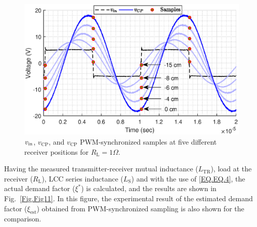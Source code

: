 \documentclass[journal,a4paper]{IEEEtran}
\begin{document}
\begin{figure}[t!]
\begin{center}
	\includegraphics[clip, trim=1cm 0.0cm 1cm 0cm, width=1\columnwidth]{Figs/Fig10.eps}
\end{center}
\vspace{-0.1cm}
	\caption{$v_\textrm{\rm in}$, $v_\textrm{CP}$, and $v_\textrm{CP}$ PWM-synchronized samples at five different receiver positions for $R_{\mathrm{L}}=1 \Omega$.}
		\label{Fig.Fig10}
		\vspace{-3mm}
\end{figure}
\newline
Having the measured transmitter-receiver mutual inductance ($L_{\mathrm{TR}}$), load at the receiver ($R_{\mathrm{L}}$), LCC series inductance ($L_{\mathrm{S}}$) and with the use of \eqref{EQ.EQ.4}, the actual demand factor ($\xi^*$) is calculated, and the results are shown in Fig.~\ref{Fig.Fig11}. In this figure, the experimental result of the estimated demand factor ($\xi_{\mathrm{est}}$) obtained from PWM-synchronized sampling is also shown for the comparison.
\end{document}
